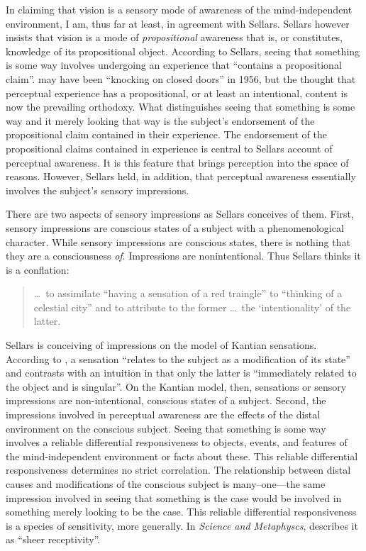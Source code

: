 \documentclass[12pt]{article}
\begin{document}
In claiming that vision is a sensory mode of awareness of the mind-independent environment, I am, thus far at least, in agreement with Sellars. Sellars however insists that vision is a mode of \emph{propositional} awareness that is, or constitutes, knowledge of its propositional object. According to Sellars, seeing that something is some way involves undergoing an experience that ``contains a propositional claim''. \citet[§15]{Sellars:1956xp} may have been ``knocking on closed doors'' in 1956, but the thought that perceptual experience has a propositional, or at least an intentional, content is now the prevailing orthodoxy. What distinguishes seeing that something is some way and it merely looking that way is the subject's endorsement of the propositional claim contained in their experience. The endorsement of the propositional claims contained in experience is central to Sellars account of perceptual awareness. It is this feature that brings perception into the space of reasons. However, Sellars held, in addition, that perceptual awareness essentially involves the subject's sensory impressions. 

There are two aspects of sensory impressions as Sellars conceives of them. First, sensory impressions are conscious states of a subject with a phenomenological character. While sensory impressions are conscious states, there is nothing that they are a consciousness \emph{of}. Impressions are nonintentional. Thus Sellars thinks it is a conflation:
\begin{quote}
    \ldots\ to assimilate ``having a sensation of a red traingle'' to ``thinking of a celestial city'' and to attribute to the former \ldots\ the `intentionality' of the latter. \citep[§7]{Sellars:1956xp}
\end{quote}
Sellars is conceiving of impressions on the model of Kantian sensations. According to \citet[B376--7]{Kant:1781fk}, a sensation ``relates to the subject as a modification of its state'' and contrasts with  an intuition in that only the latter is ``immediately related to the object and is singular''. On the Kantian model, then, sensations or sensory impressions are non-intentional, conscious states of a subject. Second, the impressions involved in perceptual awareness are the effects of the distal environment on the conscious subject. Seeing that something is some way involves a reliable differential responsiveness to objects, events, and features of the mind-independent environment or facts about these. This reliable differential responsiveness determines no strict correlation. The relationship between distal causes and modifications of the conscious subject is many--one---the same impression involved in seeing that something is the case would be involved in something merely looking to be the case. This reliable differential responsiveness is a species of sensitivity, more generally. In \emph{Science and Metaphyscs}, \citet[4]{Sellars:1967uq} describes it as ``sheer receptivity''.
\end{document}
